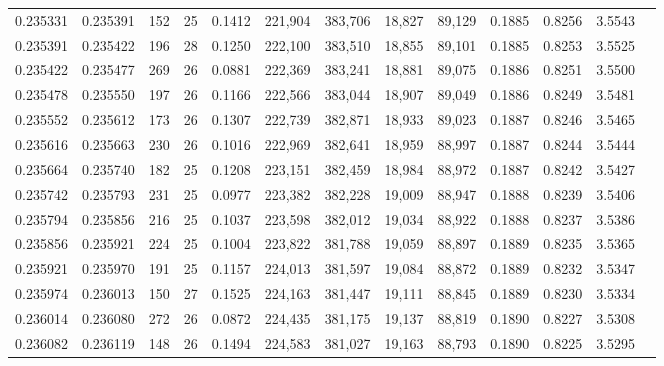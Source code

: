 \begin{tabular}{rrrrrrrrrrrrr}
0.235331 & 0.235391 &   152 &  25 &                                     0.1412 & 221,904 & 383,706 &  18,827 &  89,129 & 0.1885 & 0.8256 & 3.5543 \\
0.235391 & 0.235422 &   196 &  28 &                                     0.1250 & 222,100 & 383,510 &  18,855 &  89,101 & 0.1885 & 0.8253 & 3.5525 \\
0.235422 & 0.235477 &   269 &  26 &                                     0.0881 & 222,369 & 383,241 &  18,881 &  89,075 & 0.1886 & 0.8251 & 3.5500 \\
0.235478 & 0.235550 &   197 &  26 &                                     0.1166 & 222,566 & 383,044 &  18,907 &  89,049 & 0.1886 & 0.8249 & 3.5481 \\
0.235552 & 0.235612 &   173 &  26 &                                     0.1307 & 222,739 & 382,871 &  18,933 &  89,023 & 0.1887 & 0.8246 & 3.5465 \\
0.235616 & 0.235663 &   230 &  26 &                                     0.1016 & 222,969 & 382,641 &  18,959 &  88,997 & 0.1887 & 0.8244 & 3.5444 \\
0.235664 & 0.235740 &   182 &  25 &                                     0.1208 & 223,151 & 382,459 &  18,984 &  88,972 & 0.1887 & 0.8242 & 3.5427 \\
0.235742 & 0.235793 &   231 &  25 &                                     0.0977 & 223,382 & 382,228 &  19,009 &  88,947 & 0.1888 & 0.8239 & 3.5406 \\
0.235794 & 0.235856 &   216 &  25 &                                     0.1037 & 223,598 & 382,012 &  19,034 &  88,922 & 0.1888 & 0.8237 & 3.5386 \\
0.235856 & 0.235921 &   224 &  25 &                                     0.1004 & 223,822 & 381,788 &  19,059 &  88,897 & 0.1889 & 0.8235 & 3.5365 \\
0.235921 & 0.235970 &   191 &  25 &                                     0.1157 & 224,013 & 381,597 &  19,084 &  88,872 & 0.1889 & 0.8232 & 3.5347 \\
0.235974 & 0.236013 &   150 &  27 &                                     0.1525 & 224,163 & 381,447 &  19,111 &  88,845 & 0.1889 & 0.8230 & 3.5334 \\
0.236014 & 0.236080 &   272 &  26 &                                     0.0872 & 224,435 & 381,175 &  19,137 &  88,819 & 0.1890 & 0.8227 & 3.5308 \\
0.236082 & 0.236119 &   148 &  26 &                                     0.1494 & 224,583 & 381,027 &  19,163 &  88,793 & 0.1890 & 0.8225 & 3.5295 \\

\end{tabular}
